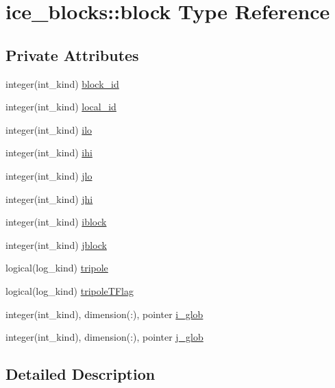 \hypertarget{typeice__blocks_1_1block}{
\section{ice\_\-blocks::block Type Reference}
\label{typeice__blocks_1_1block}
}
\subsection*{Private Attributes}
\begin{DoxyCompactItemize}
\item 
integer(int\_\-kind) \hyperlink{typeice__blocks_1_1block_a5751ccb322f36de26c169943e22ab873}{block\_\-id}
\item 
integer(int\_\-kind) \hyperlink{typeice__blocks_1_1block_a121a7f594cb941d46b365ca28ba6c08b}{local\_\-id}
\item 
integer(int\_\-kind) \hyperlink{typeice__blocks_1_1block_ae5b26aaa04f4327e685ee78e924bcc66}{ilo}
\item 
integer(int\_\-kind) \hyperlink{typeice__blocks_1_1block_a14b021a5da7afb6e1ff5e7768c31e522}{ihi}
\item 
integer(int\_\-kind) \hyperlink{typeice__blocks_1_1block_ac42b17cf254ead5ab8c41c9c40556833}{jlo}
\item 
integer(int\_\-kind) \hyperlink{typeice__blocks_1_1block_ac30450237c648eabd7384ddae651903b}{jhi}
\item 
integer(int\_\-kind) \hyperlink{typeice__blocks_1_1block_a9c4a04686c173792b32836f6394f9479}{iblock}
\item 
integer(int\_\-kind) \hyperlink{typeice__blocks_1_1block_ad4a24ca3161e8f30d7e14160f096f22a}{jblock}
\item 
logical(log\_\-kind) \hyperlink{typeice__blocks_1_1block_a5addb9117a4edb4f17580cbc681c7122}{tripole}
\item 
logical(log\_\-kind) \hyperlink{typeice__blocks_1_1block_abf16a424a7624c7571a818877c7ad5a4}{tripoleTFlag}
\item 
integer(int\_\-kind), dimension(:), pointer \hyperlink{typeice__blocks_1_1block_a42fd3473e2b856717381b5511eafa8af}{i\_\-glob}
\item 
integer(int\_\-kind), dimension(:), pointer \hyperlink{typeice__blocks_1_1block_a831bdda5b9ae05ad0b53ef557563cb36}{j\_\-glob}
\end{DoxyCompactItemize}


\subsection{Detailed Description}


